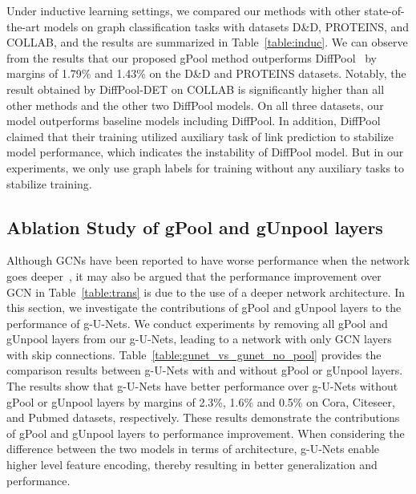 \documentclass{article}
\begin{document}
Under inductive learning settings, we compared our
methods with other state-of-the-art models on graph classification
tasks with datasets D\&D, PROTEINS, and COLLAB, and the results are
summarized in Table~\ref{table:induc}. We can observe from the
results that our proposed gPool method outperforms
DiffPool~\citep{ying2018hierarchical} by margins of 1.79\% and
1.43\% on the D\&D and PROTEINS datasets. Notably, the result
obtained by DiffPool-DET on COLLAB is significantly higher than all
other methods and the other two DiffPool models. On all three
datasets, our model outperforms baseline models including DiffPool.
In addition, DiffPool claimed that their training utilized auxiliary
task of link prediction to stabilize model performance, which indicates
the instability of DiffPool model. But in our
experiments, we only use graph labels for training without any
auxiliary tasks to stabilize training.

\subsection{Ablation Study of gPool and gUnpool layers}

Although GCNs have been reported to have worse performance when the
network goes deeper~\citep{kipf2016semi}, it may also be argued that
the performance improvement over GCN in Table~\ref{table:trans} is
due to the use of a deeper network architecture. In this section, we
investigate the contributions of gPool and gUnpool layers to the
performance of g-U-Nets. We conduct experiments by removing all
gPool and gUnpool layers from our g-U-Nets, leading to a network
with only GCN layers with skip connections.
Table~\ref{table:gunet_vs_gunet_no_pool} provides the comparison
results between g-U-Nets with and without gPool or gUnpool layers.
The results show that g-U-Nets have better performance over g-U-Nets
without gPool or gUnpool layers by margins of 2.3\%, 1.6\% and 0.5\% on Cora, Citeseer, and Pubmed
datasets, respectively. These results
demonstrate the contributions of gPool and gUnpool layers to
performance improvement. When considering the difference between the
two models in terms of architecture, g-U-Nets enable higher level
feature encoding, thereby resulting in better generalization and
performance.
\end{document}

